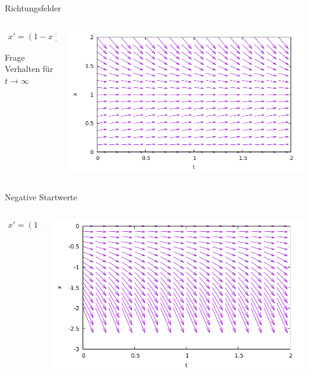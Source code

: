 \documentclass[notheorems,hidelinks,aspectratio=1610]{beamer}
\begin{document}
\begin{frame}{Richtungsfelder}
  \begin{columns}
    \begin{column}[t]{.2\textwidth}
    \begin{gather*}
      x'= (1-x) x
    \end{gather*}
    \begin{exampleblock}{Frage}
      Verhalten für $t\to\infty$
    \end{exampleblock}
    \end{column}
    \begin{column}[t]{.8\textwidth}
      \mbox{}
      
      \includegraphics[width=\textwidth]{gnuplot/logistic.pdf}
    \end{column}
  \end{columns}
\end{frame}

\begin{frame}{Negative Startwerte}
  \begin{columns}
    \begin{column}[t]{.2\textwidth}
    \begin{gather*}
      x'= (1-x) x
    \end{gather*}      
    \end{column}
    \begin{column}[t]{.8\textwidth}
      \mbox{}
      
      \includegraphics[width=\textwidth]{gnuplot/logisticm.pdf}
    \end{column}
  \end{columns}
\end{frame}
\end{document}
